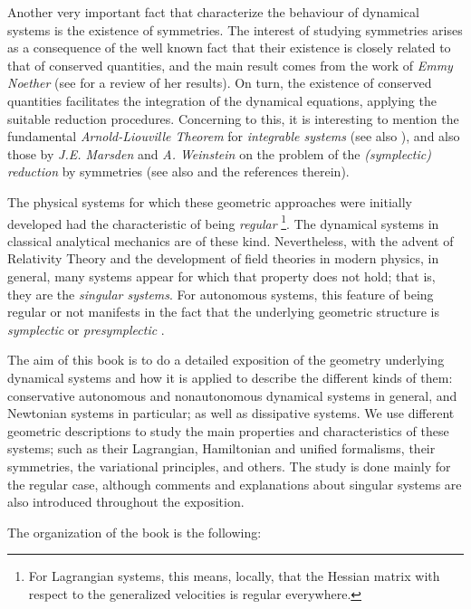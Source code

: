 \documentclass[12pt]{report}
\begin{document}
Another very important fact that characterize the behaviour of dynamical systems is
the existence of symmetries. 
The interest of studying symmetries arises as a consequence of the well known fact
that their existence is closely related to that of conserved quantities,
and the main result comes from the work of {\it Emmy Noether} \cite{No-18}
(see \cite{KS-2011} for a review of her results).
On turn, the existence of conserved quantities
facilitates the integration of  the dynamical equations,
applying the suitable reduction procedures.
Concerning to this, it is interesting to mention the fundamental {\sl Arnold-Liouville Theorem}
for {\sl integrable systems} \cite{Ar-89}
(see also \cite{Ba-99,Mi-2014}), and also those by
{\it J.E. Marsden} and {\it A. Weinstein} on the problem of the {\sl (symplectic) reduction} by symmetries
\cite{MW-74} (see also \cite{MMOPR-2007,MR-99,MW,Or-2002,OR-2002,OR-2004,OR-2004} and the references therein).

The physical systems for which these geometric approaches were initially developed
had the characteristic of being {\sl regular}
\footnote{
For Lagrangian systems, this means, locally, that the Hessian matrix with respect to the generalized velocities is regular everywhere.}.
The dynamical systems in classical analytical mechanics are of these kind.
Nevertheless, with the advent of Relativity Theory and the 
development of field theories in modern physics, in general,
many systems appear for which that property does not hold; that is,
they are the {\sl singular systems\/}.
For autonomous systems, this feature of being regular or not manifests in the fact that 
the underlying geometric structure is 
{\sl symplectic} or {\sl presymplectic}
\cite{Ca-90,CGIR-85,CLR-87,CLR-88,GN-79,GN-80,GNH-78,GP-92,MMT-97,Mu-89,MR-92,Sn-74}.

The aim of this book is to do a detailed exposition of
the geometry underlying dynamical systems and how it is applied
to describe the different kinds of them:  conservative autonomous and nonautonomous dynamical systems in general, and Newtonian systems in particular; as well as dissipative systems.
We use different geometric descriptions to study
the main properties and characteristics of these systems;
such as their Lagrangian, Hamiltonian and unified formalisms, 
their symmetries, the variational principles, and others.
The study is done mainly for the regular case,
although comments and explanations about singular systems 
are also introduced throughout the exposition.

The organization of the book is the following:
\end{document}
